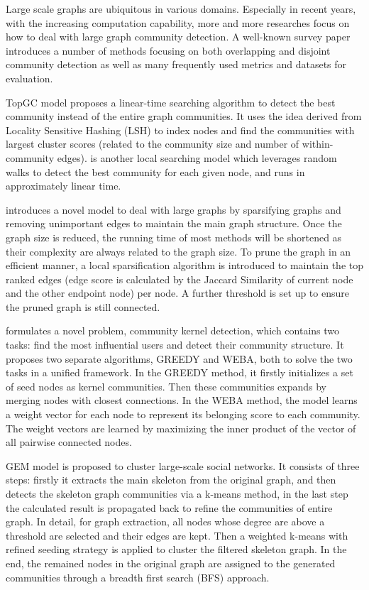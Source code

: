 Large scale graphs are ubiquitous in various domains. Especially in recent years, with the increasing computation capability, more and more researches focus on how to deal with large graph community detection. A well-known survey paper \cite{harenberg2014community} introduces a number of methods focusing on both overlapping and disjoint community detection as well as many frequently used metrics and datasets for evaluation.

TopGC model\cite{macropol2010scalable} proposes a linear-time searching algorithm to detect the best community instead of the entire graph communities. It uses the idea derived from Locality Sensitive Hashing (LSH) to index nodes and find the communities with largest cluster scores (related to the community size and number of within-community edges). \cite{spielman2013local} is another local searching model which leverages random walks to detect the best community for each given node, and runs in approximately linear time. 

\cite{satuluri2011local} introduces a novel model to deal with large graphs by sparsifying graphs and removing unimportant edges to maintain the main graph structure. Once the graph size is reduced, the running time of most methods will be shortened as their complexity are always related to the graph size. To prune the graph in an efficient manner, a local sparsification algorithm is introduced to maintain the top ranked edges (edge score is calculated by the Jaccard Similarity of current node and the other endpoint node) per node. A further threshold is set up to ensure the pruned graph is still connected. 

\cite{wang2011detecting} formulates a novel problem, community kernel detection, which contains two tasks: find the most influential users and detect their community structure.
It proposes two separate algorithms, GREEDY and WEBA, both to solve the two tasks in a unified framework. In the GREEDY method, it firstly initializes a set of seed nodes as kernel communities. Then these communities expands by merging nodes with closest connections. In the WEBA method, the model learns a weight vector for each node to represent its belonging score to each community. The weight vectors are learned by maximizing the inner product of the vector of all pairwise connected nodes.

GEM model \cite{whang2012scalable} is proposed to cluster large-scale social networks. It consists of three steps: firstly it extracts the main skeleton from the original graph, and then detects the  skeleton graph communities via a k-means method, in the last step the calculated result is propagated back to refine the communities of entire graph. In detail, for graph extraction,  all nodes whose degree are above a threshold are selected and their edges are kept. Then a weighted k-means with refined seeding strategy is applied to cluster the filtered skeleton graph.  In the end, the remained nodes in the original graph are assigned to the generated communities through a breadth first search (BFS) approach.

